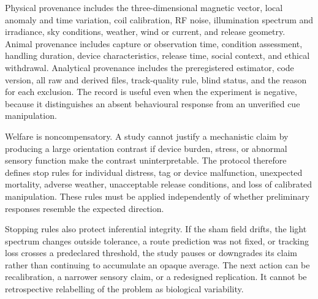 \documentclass[conference]{IEEEtran}
\begin{document}
Physical provenance includes the three-dimensional magnetic vector, local anomaly and time variation, coil calibration, RF noise, illumination spectrum and irradiance, sky conditions, weather, wind or current, and release geometry. Animal provenance includes capture or observation time, condition assessment, handling duration, device characteristics, release time, social context, and ethical withdrawal. Analytical provenance includes the preregistered estimator, code version, all raw and derived files, track-quality rule, blind status, and the reason for each exclusion. The record is useful even when the experiment is negative, because it distinguishes an absent behavioural response from an unverified cue manipulation.

Welfare is noncompensatory. A study cannot justify a mechanistic claim by producing a large orientation contrast if device burden, stress, or abnormal sensory function make the contrast uninterpretable. The protocol therefore defines stop rules for individual distress, tag or device malfunction, unexpected mortality, adverse weather, unacceptable release conditions, and loss of calibrated manipulation. These rules must be applied independently of whether preliminary responses resemble the expected direction.

Stopping rules also protect inferential integrity. If the sham field drifts, the light spectrum changes outside tolerance, a route prediction was not fixed, or tracking loss crosses a predeclared threshold, the study pauses or downgrades its claim rather than continuing to accumulate an opaque average. The next action can be recalibration, a narrower sensory claim, or a redesigned replication. It cannot be retrospective relabelling of the problem as biological variability.
\end{document}
